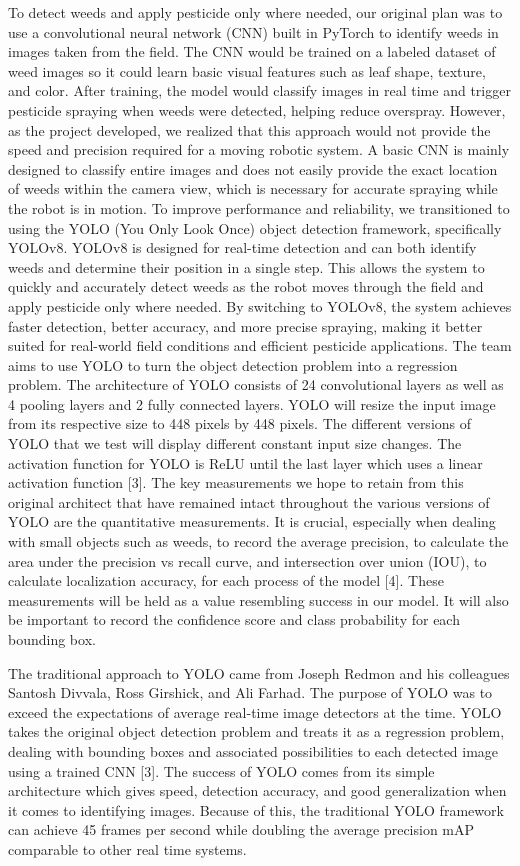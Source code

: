 \documentclass[conference]{IEEEtran}
\begin{document}
To detect weeds and apply pesticide only where needed, our original plan was to use a convolutional neural network (CNN) built in PyTorch to identify weeds in images taken from the field. The CNN would be trained on a labeled dataset of weed images so it could learn basic visual features such as leaf shape, texture, and color. After training, the model would classify images in real time and trigger pesticide spraying when weeds were detected, helping reduce overspray. However, as the project developed, we realized that this approach would not provide the speed and precision required for a moving robotic system. A basic CNN is mainly designed to classify entire images and does not easily provide the exact location of weeds within the camera view, which is necessary for accurate spraying while the robot is in motion. To improve performance and reliability, we transitioned to using the YOLO (You Only Look Once) object detection framework, specifically YOLOv8. YOLOv8 is designed for real-time detection and can both identify weeds and determine their position in a single step. This allows the system to quickly and accurately detect weeds as the robot moves through the field and apply pesticide only where needed. By switching to YOLOv8, the system achieves faster detection, better accuracy, and more precise spraying, making it better suited for real-world field conditions and efficient pesticide applications. The team aims to use YOLO to turn the object detection problem into a regression problem. The architecture of YOLO consists of 24 convolutional layers as well as 4 pooling layers and 2 fully connected layers. YOLO will resize the input image from its respective size to 448 pixels by 448 pixels. The different versions of YOLO that we test will display different constant input size changes. The activation function for YOLO is ReLU until the last layer which uses a linear activation function [3]. The key measurements we hope to retain from this original architect that have remained intact throughout the various versions of YOLO are the quantitative measurements. It is crucial, especially when dealing with small objects such as weeds, to record the average precision, to calculate the area under the precision vs recall curve, and intersection over union (IOU), to calculate localization accuracy, for each process of the model [4]. These measurements will be held as a value resembling success in our model. It will also be important to record the confidence score and class probability for each bounding box.

The traditional approach to YOLO came from Joseph Redmon and his colleagues Santosh Divvala, Ross Girshick, and Ali Farhad. The purpose of YOLO was to exceed the expectations of average real-time image detectors at the time. YOLO takes the original object detection problem and treats it as a regression problem, dealing with bounding boxes and associated possibilities to each detected image using a trained CNN [3]. The success of YOLO comes from its simple architecture which gives speed, detection accuracy, and good generalization when it comes to identifying images. Because of this, the traditional YOLO framework can achieve 45 frames per second while doubling the average precision mAP comparable to other real time systems.
\end{document}

